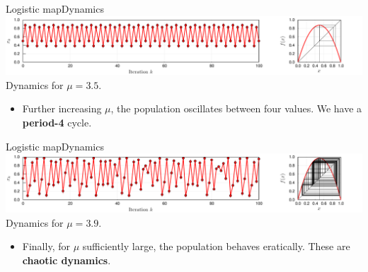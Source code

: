\documentclass[usenames,dvipsnames,svgnames,10pt,aspectratio=169]{beamer}
\begin{document}
\begin{frame}[t, c]{Logistic map}{Dynamics}
	\centering
	\includegraphics[width=\textwidth]{dynamics_d} \\
	{
	\small
	Dynamics for \( \mu = 3.5 \).
	}

	\begin{itemize}
		\item Further increasing \( \mu	\), the population oscillates between four values.
		We have a \textbf{period-4} cycle.
	\end{itemize}

	\vspace{1cm}
\end{frame}

\begin{frame}[t, c]{Logistic map}{Dynamics}
	\centering
	\includegraphics[width=\textwidth]{dynamics_e} \\
	{
	\small
	Dynamics for \( \mu = 3.9 \).
	}

	\begin{itemize}
		\item Finally, for \( \mu \) sufficiently large, the population behaves eratically.
		These are \textbf{chaotic dynamics}.
	\end{itemize}

	\vspace{1cm}
\end{frame}
\end{document}
